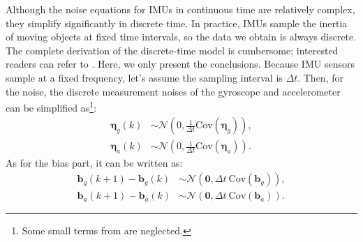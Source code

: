 Although the noise equations for IMUs in continuous time are relatively complex, they simplify significantly in discrete time. In practice, IMUs sample the inertia of moving objects at fixed time intervals, so the data we obtain is always discrete. The complete derivation of the discrete-time model is cumbersome; interested readers can refer to \cite{Crassidis2006}. Here, we only present the conclusions. Because IMU sensors sample at a fixed frequency, let's assume the sampling interval is $\Delta t$. Then, for the noise, the discrete measurement noises of the gyroscope and accelerometer can be simplified as\footnote{Some small terms from \cite{Crassidis2006} are neglected.}:
\begin{subequations}\label{eq:discrete-noise}
	\begin{align}
		\boldsymbol{\eta}_{g}(k) & \sim \mathcal{N}(0, \frac{1}{\Delta t}  \mathrm{Cov}(\boldsymbol{\eta}_g)),
		\\
		\boldsymbol{\eta}_{a}(k) & \sim \mathcal{N}(0,  \frac{1}{\Delta t} \mathrm{Cov}(\boldsymbol{\eta}_a)) .
	\end{align}
\end{subequations}
As for the bias part, it can be written as:
\begin{subequations}\label{eq:discrete-bias}
	\begin{align}
		\mathbf{b}_g(k+1) - \mathbf{b}_g(k) &\sim \mathcal{N}(\mathbf{0}, \Delta t \ \mathrm{Cov}(\mathbf{b}_g)), \\
		\mathbf{b}_a(k+1) - \mathbf{b}_a(k) &\sim \mathcal{N}(\mathbf{0}, \Delta t \ \mathrm{Cov}(\mathbf{b}_a)).
	\end{align}
\end{subequations}

